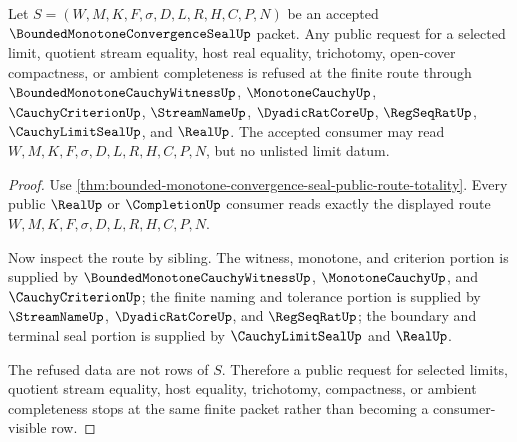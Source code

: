 \begin{theorem}
\label{thm:bounded-monotone-convergence-seal-public-limit-refusal}
Let $S=(W,M,K,F,\sigma,D,L,R,H,C,P,N)$ be an accepted $\BoundedMonotoneConvergenceSealUp$ packet. Any public request for a selected limit, quotient stream equality, host real equality, trichotomy, open-cover compactness, or ambient completeness is refused at the finite route through $\BoundedMonotoneCauchyWitnessUp$, $\MonotoneCauchyUp$, $\CauchyCriterionUp$, $\StreamNameUp$, $\DyadicRatCoreUp$, $\RegSeqRatUp$, $\CauchyLimitSealUp$, and $\RealUp$. The accepted consumer may read $W,M,K,F,\sigma,D,L,R,H,C,P,N$, but no unlisted limit datum.
\end{theorem}
\begin{proof}
Use \autoref{thm:bounded-monotone-convergence-seal-public-route-totality}. Every public $\RealUp$ or $\CompletionUp$ consumer reads exactly the displayed route $W,M,K,F,\sigma,D,L,R,H,C,P,N$.

Now inspect the route by sibling. The witness, monotone, and criterion portion is supplied by $\BoundedMonotoneCauchyWitnessUp$, $\MonotoneCauchyUp$, and $\CauchyCriterionUp$; the finite naming and tolerance portion is supplied by $\StreamNameUp$, $\DyadicRatCoreUp$, and $\RegSeqRatUp$; the boundary and terminal seal portion is supplied by $\CauchyLimitSealUp$ and $\RealUp$.

The refused data are not rows of $S$. Therefore a public request for selected limits, quotient stream equality, host equality, trichotomy, compactness, or ambient completeness stops at the same finite packet rather than becoming a consumer-visible row.
\end{proof}

